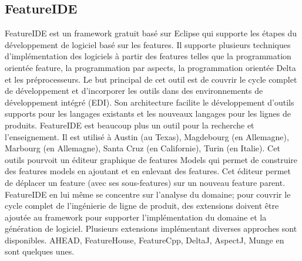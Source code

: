 \subsection{FeatureIDE}
FeatureIDE \cite{hum2012} est un framework gratuit basé sur Eclipse qui supporte les étapes du développement de logiciel basé sur les features. Il supporte plusieurs techniques d'implémentation des logiciels à partir des features telles que la programmation orientée feature, la programmation par aspects, la programmation orientée Delta et  les préprocesseurs. Le but principal de cet outil est de couvrir le cycle complet de développement et d'incorporer les outils dans des environnements de développement intégré (EDI). Son architecture facilite le développement d'outils supports pour les langages existants et les nouveaux langages pour les lignes de produits. FeatureIDE est beaucoup plus un outil pour la recherche et l'enseignement. Il est utilisé à Austin (au Texas), Magdebourg (en Allemagne), Marbourg (en Allemagne), Santa Cruz (en Californie), Turin (en Italie). Cet outils pourvoit un éditeur graphique de features Models qui permet de construire des features models en ajoutant et en enlevant des features. Cet éditeur permet de déplacer un feature (avec ses sous-features) sur un nouveau feature parent. FeatureIDE en lui même se concentre sur l'analyse du domaine; pour couvrir le cycle complet de l'ingénierie de ligne de produit, des extensions doivent être ajoutée au framework pour supporter l'implémentation du domaine et la génération de logiciel. Plusieurs extensions implémentant diverses approches sont disponibles. AHEAD, FeatureHouse, FeatureCpp, DeltaJ, AspectJ, Munge en sont quelques unes.  
       

